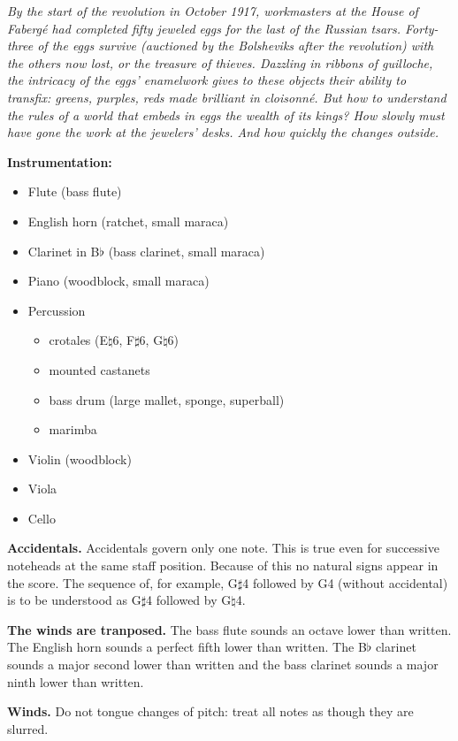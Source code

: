 \textit{By the start of the revolution in October 1917, workmasters at the
House of Fabergé had completed fifty jeweled eggs for the last of the Russian
tsars. Forty-three of the eggs survive (auctioned by the Bolsheviks after the
revolution) with the others now lost, or the treasure of thieves. Dazzling in
ribbons of guilloche, the intricacy of the eggs' enamelwork gives to these
objects their ability to transfix: greens, purples, reds made brilliant in
cloisonné. But how to understand the rules of a world that embeds in eggs the
wealth of its kings? How slowly must have gone the work at the jewelers' desks.
And how quickly the changes outside.}

\textbf{Instrumentation:}

\begin{itemize} \itemsep2pt
\item Flute (bass flute)
\item English horn (ratchet, small maraca)
\item Clarinet in B$\flat$ (bass clarinet, small maraca)
\item Piano (woodblock, small maraca)
\item Percussion
    \begin{itemize}
    \item crotales (E$\natural$6, F$\sharp$6, G$\natural$6)
    \item mounted castanets
    \item bass drum (large mallet, sponge, superball)
    \item marimba
    \end{itemize}
\item Violin (woodblock)
\item Viola
\item Cello
\end{itemize}

\textbf{Accidentals.} Accidentals govern only one note. This is true even for
successive noteheads at the same staff position. Because of this no natural
signs appear in the score. The sequence of, for example, G$\sharp$4 followed by
G4 (without accidental) is to be understood as G$\sharp$4 followed by
G$\natural$4.

\textbf{The winds are tranposed.} The bass flute sounds an octave lower than
written. The English horn sounds a perfect fifth lower than written. The
B$\flat$ clarinet sounds a major second lower than written and the bass
clarinet sounds a major ninth lower than written.

\textbf{Winds.} Do not tongue changes of pitch: treat all notes as though they
are slurred. 

